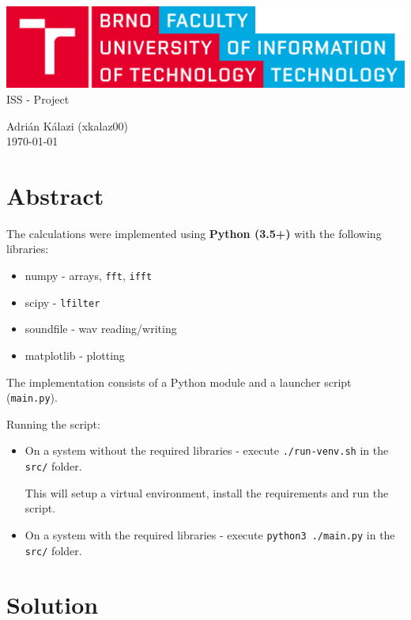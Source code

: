 \documentclass[a4paper, 11pt]{article}
\begin{document}
    \begin{center}
    {\includegraphics[width=0.4\linewidth]{fig/logo_en.png}}
        \\
        [0.4cm]

        {\LARGE
        ISS - Project \\
        [0.4cm]
        }

        {\large
        Adrián Kálazi (xkalaz00) \\
        \today
        }
    \end{center}

    \section*{Abstract}

    The calculations were implemented using \textbf{Python (3.5+)} with the following libraries:

    \begin{itemize}
        \item numpy - arrays, \texttt{fft}, \texttt{ifft}
        \item scipy - \texttt{lfilter}
        \item soundfile - wav reading/writing
        \item matplotlib - plotting
    \end{itemize}

    The implementation consists of a Python module and a launcher script (\texttt{main.py}).

    Running the script:
    \begin{itemize}
        \item
        On a system without the required libraries - execute \texttt{./run-venv.sh} in the \texttt{src/} folder.

        This will setup a virtual environment, install the requirements and run the script.
        \item
        On a system with the required libraries - execute \texttt{python3 ./main.py} in the \texttt{src/} folder.
    \end{itemize}

    \section*{Solution}
\end{document}
